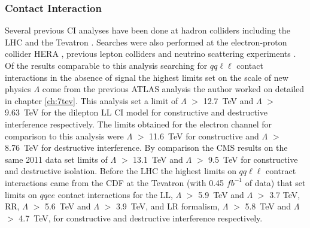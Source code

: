     \subsubsection*{Contact Interaction}
        Several previous CI analyses have been done at hadron colliders including the LHC \cite{PhysRevD.87.015010,ATLAS:2012pu,PhysRevD.87.032001,PhysRevD.87.052017} and the Tevatron \cite{PhysRevLett.103.191803,PhysRevLett.96.211801,PhysRevLett.87.231803,PhysRevLett.82.4769,PhysRevLett.79.2198,Abbiendi2003331,Abbiendi2000553}. Searches were also performed at the electron-proton collider HERA \cite{Chekanov200423,Adloff2000358,Adloff200335}, previous lepton colliders \cite{Abdallah2009.60.1,Schael2007.49.411,Abdallah2006.45.589,Abbiendi2004.33.173,Acciarri200081} and neutrino scattering experiments \cite{McFarland2005.161}. Of the results comparable to this analysis searching for $qq\ell\ell$ contact interactions in the absence of signal the highest limits set on the scale of new physics $\Lambda$ come from the previous ATLAS analysis the author worked on \cite{PhysRevD.87.015010} detailed in chapter \ref{ch:7tev}. This analysis set a limit of $\Lambda$ $>$ 12.7~TeV and $\Lambda$ $>$ 9.63~TeV for the dilepton LL CI model for constructive and destructive interference respectively. The limits obtained for the electron channel for comparison to this analysis were $\Lambda$ $>$ 11.6~TeV for constructive and $\Lambda$ $>$ 8.76~TeV for destructive interference. By comparison the CMS results on the same 2011 data \cite{PhysRevD.87.032001} set limits of $\Lambda$ $>$ 13.1~TeV and $\Lambda$ $>$ 9.5~TeV for constructive and destructive isolation. Before the LHC the highest limits on $qq\ell\ell$ contract interactions came from the CDF at the Tevatron \cite{PhysRevLett.96.211801} (with 0.45 $fb^{-1}$ of data) that set limits on $qqee$ contact interactions for the LL, $\Lambda$ $>$ 5.9~TeV and $\Lambda$ $>$ 3.7 TeV, RR, $\Lambda$ $>$ 5.6~TeV and $\Lambda$ $>$ 3.9~TeV, and LR formalism, $\Lambda$ $>$ 5.8~TeV and $\Lambda$ $>$ 4.7~TeV, for constructive and destructive interference respectively. 


